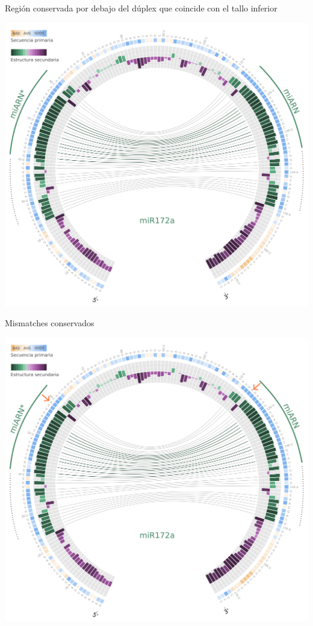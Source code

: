 \documentclass{beamer}
\begin{document}
\begin{frame}{Región conservada por debajo del dúplex que coincide con el tallo inferior}
	\begin{center}
		\includegraphics[width=.8\textwidth]{img/miR172a_circos05.png}
	\end{center}
\end{frame}

\begin{frame}{Mismatches conservados}
	\begin{center}
		\includegraphics[width=.8\textwidth]{img/miR172a_circos06.png}
	\end{center}
\end{frame}
\end{document}
